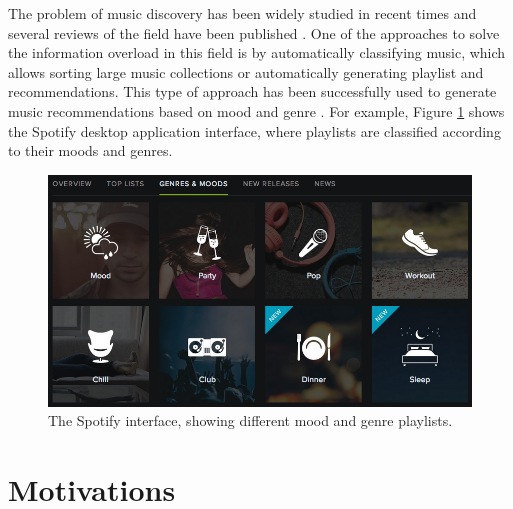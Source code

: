  
The problem of music discovery has been widely studied in recent times and several reviews of the field have been published \cite{Song2012, Celma2009, Celma2011}.  One of the approaches to solve the information overload in this field is by automatically classifying music, which allows sorting large music collections or automatically generating playlist and recommendations. This type of approach has been successfully used to generate music recommendations based on mood  \cite{Han2009} and genre \cite{Hu2012}. For example, Figure \ref{fig:spotify_recs} shows the Spotify desktop application interface, where playlists are classified according to their moods and genres.



  \begin{figure}[h!]
\centering
\includegraphics[width=1 \textwidth]{figures/spotify_2}
\caption{The Spotify interface, showing  different mood and genre playlists.}
\label{fig:spotify_recs}
\end{figure}
 


\section{Motivations}


